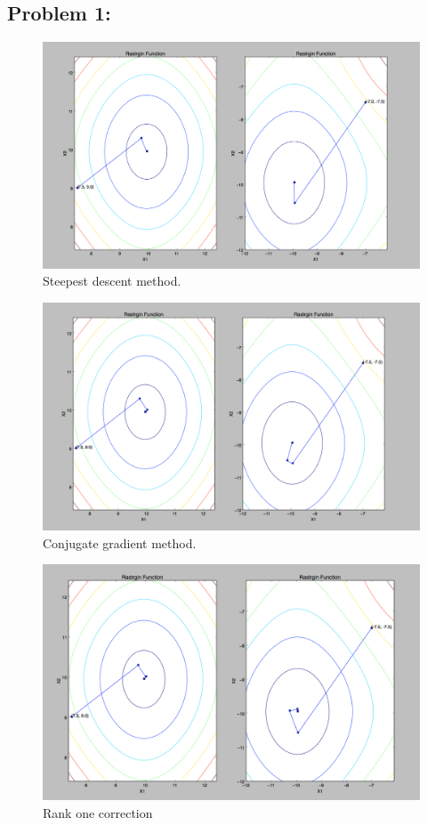 \documentclass{article}
\begin{document}
 

\hypertarget{}{}
\subsection*{{Problem 1: }}
\label{}


\begin{figure}[h]
\includegraphics[width=\textwidth]{image/steepest_descent}
\centering
\caption{Steepest descent method. }
\end{figure} 

\begin{figure}[h]
\includegraphics[width=\textwidth]{image/conjugate_gradient}
\centering
\caption{Conjugate gradient method. }
\end{figure} 

\begin{figure}[h]
\includegraphics[width=\textwidth]{image/rankone_method}
\centering
\caption{Rank one correction}
\end{figure} 
\end{document}
